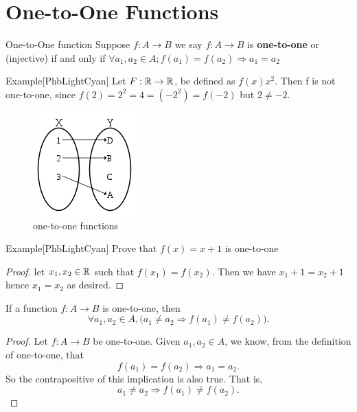 \documentclass[../MATH-2000-Notes.tex]{subfiles}
\begin{document}
\section{One-to-One Functions}
\begin{Definition}
    {One-to-One function}
    Suppose \(f:A\rightarrow B\) we say \(f:A\rightarrow B\) is \textbf{one-to-one} or (injective) if and only if \(\forall a_1,a_2\in A; f(a_1) = f(a_2) \Rightarrow a_1 = a_2\)
\end{Definition}
\begin{commentbox}{Example}[{PhbLightCyan}]
    Let \(F: \mathbb{R} \rightarrow \mathbb{R}\), be defined as \(f(x) x^2\). Then f is not one-to-one, since \(f(2) = 2^2 = 4 = (-2^2) = f(-2)\) but \(2 \neq -2\).
\end{commentbox}
\begin{figure}[h]
    \centering
    \includegraphics[width=0.6\columnwidth]{../Assets/150px-Injection.svg.png}
    \caption{one-to-one functions}
    \label{fig:1to1}
\end{figure}
\begin{commentbox}{Example}[{PhbLightCyan}]
    Prove that \(f(x) = x + 1\) is one-to-one
\end{commentbox}
\begin{proof}
    let \(x_1,x_2 \in \mathbb{R}\) such that \(f(x_1) = f(x_2)\). Then we have \(x_1 + 1 = x_2 + 1\) hence \(x_1 = x_2\) as desired.
\end{proof}
\begin{Theorem}
    {}\label{alternate11thm}
    If a function $f\colon A \to B$ is one-to-one, then $$\forall a_1, a_2 \in A, \bigl( a_1 \neq a_2 \Rightarrow f(a_1) \neq f(a_2)\bigr).$$
\end{Theorem}
\begin{proof}
    Let $f \colon A \to B$ be one-to-one. Given $a_1,a_2 \in A$, we know, from the definition of one-to-one,  that
    $$  f(a_1) = f(a_2) \Rightarrow a_1 = a_2 .$$
    So the contrapositive of this implication is also true. That is,
    \[
        a_1 \neq a_2 \Rightarrow f(a_1) \neq f(a_2) .
    \]
\end{proof}
\end{document}
